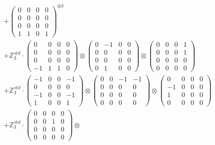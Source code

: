 \documentclass{article}
\begin{document}
{\begin{align}
        &+ \label{Rs16-Rc11-Solution-21-c16} \begin{pmatrix} 0 & 0 & 0 & 0 \\ 0 & 0 & 0 & 0 \\ 0 & 0 & 0 & 0 \\ 1 & 1 & 0 & 1 \end{pmatrix}^{\otimes 3} \\
        &+ \label{Rs16-Rc11-Solution-21-c17} \mathbb{Z}_3^{std} \cdot 
            \begin{pmatrix} 0 & 0 & 0 & 0 \\ 0 & 0 & 0 & 0 \\ 0 & 0 & 0 & 0 \\ -1 & 1 & 1 & 0 \end{pmatrix} \otimes 
            \begin{pmatrix} 0 & -1 & 0 & 0 \\ 0 & 0 & 0 & 0 \\ 0 & 0 & 0 & 0 \\ 0 & 1 & 0 & 0 \end{pmatrix} \otimes 
            \begin{pmatrix} 0 & 0 & 0 & 1 \\ 0 & 0 & 0 & 1 \\ 0 & 0 & 0 & 0 \\ 0 & 0 & 0 & 0 \end{pmatrix} \\ 
        &+ \label{Rs16-Rc11-Solution-21-c18} \mathbb{Z}_3^{std} \cdot 
            \begin{pmatrix} -1 & 0 & 0 & -1 \\ 0 & 0 & 0 & 0 \\ -1 & 0 & 0 & -1 \\ 1 & 0 & 0 & 1 \end{pmatrix} \otimes 
            \begin{pmatrix} 0 & 0 & -1 & -1 \\ 0 & 0 & 0 & 0 \\ 0 & 0 & 0 & 0 \\ 0 & 0 & 0 & 0 \end{pmatrix} \otimes 
            \begin{pmatrix} 0 & 0 & 0 & 0 \\ -1 & 0 & 0 & 0 \\ 1 & 0 & 0 & 0 \\ 0 & 0 & 0 & 0 \end{pmatrix} \\ 
        &+ \label{Rs16-Rc11-Solution-21-c19} \mathbb{Z}_3^{std} \cdot 
            \begin{pmatrix} 0 & 0 & 0 & 0 \\ 0 & 0 & 1 & 0 \\ 0 & 0 & 0 & 0 \\ 0 & 0 & 0 & 0 \end{pmatrix} \otimes 

\end{align}}
\end{document}
